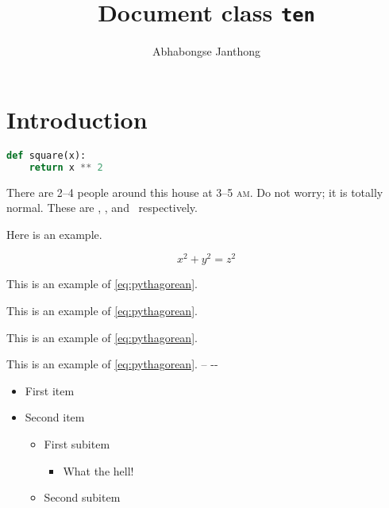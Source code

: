\usepackage{lipsum}
\title{Document class \texttt{ten}}
\author{Abhabongse Janthong}



    \maketitle

    \section{Introduction}
    \label{sec:intro}

    \lipsum[1]

\begin{lstlisting}[language=python,caption={A square function, obviously.}]
def square(x):
    return x ** 2
\end{lstlisting}

    \lipsum[2]

    There are 2--4 people around this house at 3--5 \textsc{am}.  Do not worry; it is totally normal. These are , , and \ respectively.

    Here is an example.

    \begin{equation}
        x^2 + y^2 = z^2  \label{eq:pythagorean}
    \end{equation}

    This is an example of \eqref{eq:pythagorean}. \lipsum[3]

    \begin{example}
        This is an example of \eqref{eq:pythagorean}.
    \end{example}

    \lipsum[4]

    \begin{example*}[likeme]
        This is an example of \eqref{eq:pythagorean}.
    \end{example*}

    \lipsum[5]
    \begin{note}
        This is an example of \eqref{eq:pythagorean}. \rsq\gsq\bsq\ysq -- {-}{-}
    \end{note}
    \lipsum[6]

    \begin{itemize}
        \item  First item
        \item  Second item
            \begin{itemize}
                \item  First subitem
                    \begin{itemize}
                        \item  What the hell!
                    \end{itemize}
                \item  Second subitem
            \end{itemize}
    \end{itemize}


